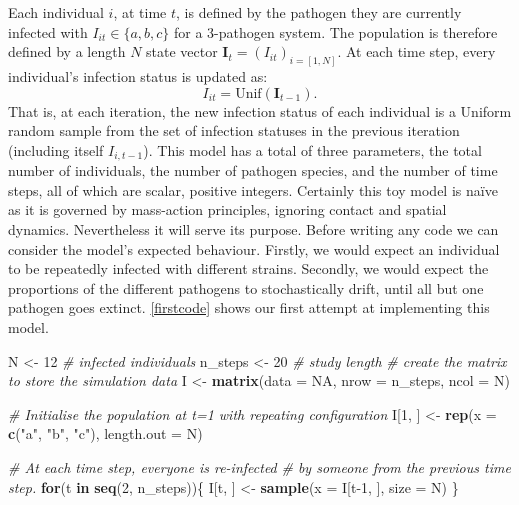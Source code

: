 \documentclass[]{elsarticle} %
\newenvironment{Shaded}{\begin{snugshade}}{\end{snugshade}}
\newcommand{\CommentTok}[1]{\textcolor[rgb]{0.56,0.35,0.01}{\textit{#1}}}
\newcommand{\ControlFlowTok}[1]{\textcolor[rgb]{0.13,0.29,0.53}{\textbf{#1}}}
\newcommand{\DataTypeTok}[1]{\textcolor[rgb]{0.13,0.29,0.53}{#1}}
\newcommand{\DecValTok}[1]{\textcolor[rgb]{0.00,0.00,0.81}{#1}}
\newcommand{\KeywordTok}[1]{\textcolor[rgb]{0.13,0.29,0.53}{\textbf{#1}}}
\newcommand{\NormalTok}[1]{#1}
\newcommand{\OtherTok}[1]{\textcolor[rgb]{0.56,0.35,0.01}{#1}}
\newcommand{\StringTok}[1]{\textcolor[rgb]{0.31,0.60,0.02}{#1}}
\begin{document}
Each individual \(i\), at time \(t\), is defined by the pathogen they are currently infected with \(I_{it} \in \{a, b, c\}\) for a 3-pathogen system.
The population is therefore defined by a length \(N\) state vector \(\mathbf{I}_t = (I_{it})_{i=[1,N]}\).
At each time step, every individual's infection status is updated as:
\[I_{it} = \text{Unif}(\mathbf{I}_{t-1}).\]
That is, at each iteration, the new infection status of each individual is a Uniform random sample from the set of infection statuses in the previous iteration (including itself \(I_{i,t-1}\)).
This model has a total of three parameters, the total number of individuals, the number of pathogen species, and the number of time steps, all of which are scalar, positive integers.
Certainly this toy model is naïve as it is governed by mass-action principles, ignoring contact and spatial dynamics.
Nevertheless it will serve its purpose.
Before writing any code we can consider the model's expected behaviour.
Firstly, we would expect an individual to be repeatedly infected with different strains.
Secondly, we would expect the proportions of the different pathogens to stochastically drift, until all but one pathogen goes extinct.
\ref{firstcode} shows our first attempt at implementing this model.
\newline
{}\label{firstcode}

\begin{Shaded}
\begin{Highlighting}[]
\NormalTok{N <-}\StringTok{ }\DecValTok{12} \CommentTok{# infected individuals}
\NormalTok{n_steps <-}\StringTok{ }\DecValTok{20} \CommentTok{# study length}
\CommentTok{# create the matrix to store the simulation data}
\NormalTok{I <-}\StringTok{ }\KeywordTok{matrix}\NormalTok{(}\DataTypeTok{data =} \OtherTok{NA}\NormalTok{, }\DataTypeTok{nrow =}\NormalTok{ n_steps, }\DataTypeTok{ncol =}\NormalTok{ N)}

\CommentTok{# Initialise the population at t=1 with repeating configuration}
\NormalTok{I[}\DecValTok{1}\NormalTok{, ] <-}\StringTok{ }\KeywordTok{rep}\NormalTok{(}\DataTypeTok{x =} \KeywordTok{c}\NormalTok{(}\StringTok{"a"}\NormalTok{, }\StringTok{"b"}\NormalTok{, }\StringTok{"c"}\NormalTok{), }\DataTypeTok{length.out =}\NormalTok{ N)}

\CommentTok{# At each time step, everyone is re-infected }
\CommentTok{# by someone from the previous time step.}
\ControlFlowTok{for}\NormalTok{(t }\ControlFlowTok{in} \KeywordTok{seq}\NormalTok{(}\DecValTok{2}\NormalTok{, n_steps))\{}
\NormalTok{  I[t, ] <-}\StringTok{ }\KeywordTok{sample}\NormalTok{(}\DataTypeTok{x =}\NormalTok{ I[t}\DecValTok{-1}\NormalTok{, ], }\DataTypeTok{size =}\NormalTok{ N)}
\NormalTok{\}}
\end{Highlighting}
\end{Shaded}
\end{document}
